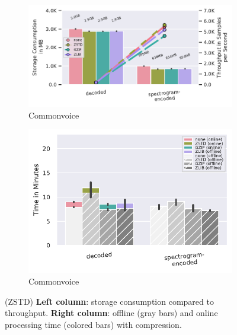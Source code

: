 \documentclass[sigconf,nonacm]{acmart}
\begin{document}
\begin{figure}[b]
  \begin{subfigure}{0.49 \columnwidth}
    \includegraphics[width=\linewidth]{../images/commonvoice-pipeline/compressed-storage-vs-throughput.pdf}
    \caption{Commonvoice}
    \Description{}
    \label{fig:zstd-commonvoice-compressed-storage-vs-throughput}
  \end{subfigure}
  \hfill %
  \begin{subfigure}{0.49 \columnwidth}
    \includegraphics[width=\linewidth]{../images/commonvoice-pipeline/compression-processing-time-split.pdf}
    \caption{Commonvoice}
    \Description{}
    \label{fig:zstd-commonvoice-compression-processing-time-split}
  \end{subfigure}
  
  \caption{(ZSTD) \textbf{Left column}: storage consumption compared to throughput. \textbf{Right column}: offline (gray bars) and online processing time (colored bars) with compression.}
  \label{fig:zstd-experiments}
\end{figure}
\end{document}
